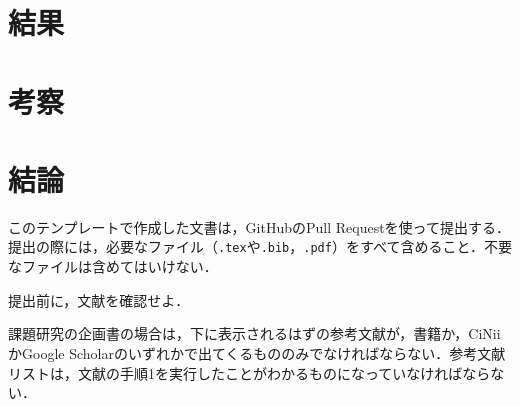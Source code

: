 \documentclass[uplatex,twocolumn,dvipdfmx]{jsarticle}
\begin{document}
\section{結果}

\section{考察}

\section{結論}

このテンプレートで作成した文書は，GitHubのPull Requestを使って提出する．提出の際には，必要なファイル（\verb|.tex|や\verb|.bib|，\verb|.pdf|）をすべて含めること．不要なファイルは含めてはいけない．

提出前に，文献\cite{文章チェックリスト}を確認せよ．

課題研究の企画書の場合は，下に表示されるはずの参考文献が，書籍か，CiNiiかGoogle Scholarのいずれかで出てくるもののみでなければならない．参考文献リストは，文献\cite{アイデアのつくり方}の手順1を実行したことがわかるものになっていなければならない．


\end{document}
